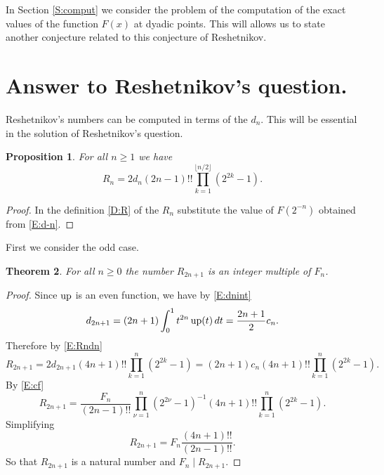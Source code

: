 \documentclass[10pt]{amsart}
\newtheorem{thm}{Theorem}
\newtheorem{prop}[thm]{Proposition}
\theoremstyle{definition}
\theoremstyle{remark}
\begin{document}
In Section \ref{S:comput} we consider the problem of the computation of
the exact values of the function $F(x)$
at dyadic points. This will allows us to state another conjecture related to this
conjecture of Reshetnikov.





\section{Answer to Reshetnikov's question.}


Reshetnikov's numbers can be computed in terms of the $d_n$. This  will be
essential in the solution of Reshetnikov's question.

\begin{prop}\label{P:Rndn}
For all $n\ge1$ we have
\begin{equation}\label{E:Rndn}
R_n=2d_n (2n-1)!! \prod_{k=1}^{\lfloor n/2\rfloor}(2^{2k}-1).
\end{equation}
\end{prop}

\begin{proof}
In the definition \eqref{D:R} of the $R_n$ substitute the value of
$F(2^{-n})$ obtained from \eqref{E:d-n}.
\end{proof}



First we consider the odd case.
\begin{thm}\label{T:6}
For all $n\ge0$ the number $R_{2n+1}$ is an integer multiple of $F_n$.
\end{thm}
\begin{proof}
Since $\operatorname{up}$ is an even function, we have by  \eqref{E:dnint}
\[d_{2n+1}=(2n+1)\int_0^1t^{2n}\operatorname{up}(t)\,dt=\frac{2n+1}{2}c_n.\]
Therefore by \eqref{E:Rndn}
\[R_{2n+1}=2d_{2n+1} (4n+1)!! \prod_{k=1}^{n}(2^{2k}-1)=(2n+1)c_n(4n+1)!! \prod_{k=1}^{n}(2^{2k}-1).\]
By \eqref{E:cf}
\[R_{2n+1}=\frac{F_n}{(2n-1)!!}\prod_{\nu=1}^n(2^{2\nu}-1)^{-1}
(4n+1)!! \prod_{k=1}^{n}(2^{2k}-1).\]
Simplifying
\begin{equation}\label{E:RF}
R_{2n+1}=F_n\frac{(4n+1)!!}{(2n-1)!!}.
\end{equation}
So that $R_{2n+1}$ is a natural number and  $F_n\mid R_{2n+1}$.
\end{proof}
\end{document}
